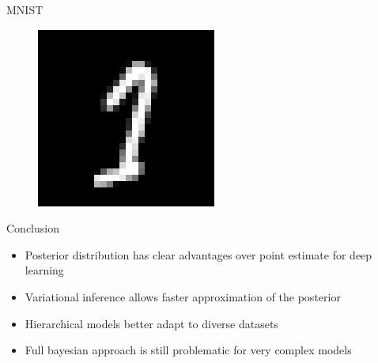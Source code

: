 \documentclass{beamer}
\begin{document}
\begin{frame}{MNIST}
\begin{minipage}[t]{0.32\columnwidth}
\begin{figure}
			\includegraphics[width=1\columnwidth]{pres_pics/low_conf/11}
		\end{figure}
	\end{minipage}
\end{frame}

\begin{frame}{Conclusion}
	\begin{itemize}
		\item Posterior distribution has clear advantages over point estimate for deep learning
		\vspace{0.2cm}
		\item Variational inference allows faster approximation of the posterior
		\vspace{0.2cm}
		\item Hierarchical models better adapt to diverse datasets
		\vspace{0.2cm}
		\item Full bayesian approach is still problematic for very complex models
	\end{itemize}
\end{frame}
\end{document}
